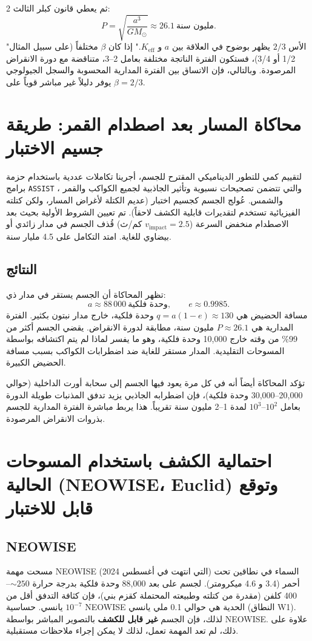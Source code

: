 \documentclass[11pt,a4paper]{article}
\begin{document}
\begin{multicols}{2}
		ثم يعطي قانون كبلر الثالث:
		\[
		P = \sqrt{\frac{a^3}{GM_{\odot}}} \approx 26.1\ \text{مليون سنة}.
		\]
		"الأس \(2/3\) يظهر بوضوح في العلاقة بين \(a\) و \(K_{\mathrm{eff}}\)." إذا كان \(\beta\) مختلفاً (على سبيل المثال 1/2 أو 3/4)، فستكون الفترة الناتجة مختلفة بعامل 2–3، متناقضة مع دورة الانقراض المرصودة. وبالتالي، فإن الاتساق بين الفترة المدارية المحسوبة والسجل الجيولوجي يوفر دليلاً غير مباشر قوياً على \(\beta = 2/3\).
		
		\section{محاكاة المسار بعد اصطدام القمر: طريقة جسيم الاختبار}
		لتقييم كمي للتطور الديناميكي المقترح للجسم، أجرينا تكاملات عددية باستخدام حزمة برامج \texttt{ASSIST} \cite{Tamayo2020}، والتي تتضمن تصحيحات نسبوية وتأثير الجاذبية لجميع الكواكب والقمر والشمس. عُولج الجسم كجسيم اختبار (عديم الكتلة لأغراض المسار، ولكن كتلته الفيزيائية تستخدم لتقديرات قابلية الكشف لاحقاً). تم تعيين الشروط الأولية بحيث بعد الاصطدام منخفض السرعة (\(v_{\text{impact}} = 2.5\) كم/ث) قُذف الجسم في مدار زائدي أو بيضاوي للغاية. امتد التكامل على 4.5 مليار سنة.
		
		\subsection{النتائج}
		تظهر المحاكاة أن الجسم يستقر في مدار ذي:
		\[
		a \approx 88\,000\ \text{وحدة فلكية},\qquad e \approx 0.9985.
		\]
		مسافة الحضيض هي \(q = a(1-e) \approx 130\) وحدة فلكية، خارج مدار نبتون بكثير. الفترة المدارية هي \(P \approx 26.1\) مليون سنة، مطابقة لدورة الانقراض. يقضي الجسم أكثر من 99\% من وقته خارج 10,000 وحدة فلكية، وهو ما يفسر لماذا لم يتم اكتشافه بواسطة المسوحات التقليدية. المدار مستقر للغاية ضد اضطرابات الكواكب بسبب مسافة الحضيض الكبيرة.
		
		تؤكد المحاكاة أيضاً أنه في كل مرة يعود فيها الجسم إلى سحابة أورت الداخلية (حوالي 20,000–30,000 وحدة فلكية)، فإن اضطرابه الجاذبي يزيد تدفق المذنبات طويلة الدورة بعامل \(10^2\)–\(10^3\) لمدة 1–2 مليون سنة تقريباً. هذا يربط مباشرة الفترة المدارية للجسم بذروات الانقراض المرصودة.
		
		\section{احتمالية الكشف باستخدام المسوحات الحالية (NEOWISE، Euclid) وتوقع قابل للاختبار}
		\subsection{NEOWISE}
		مسحت مهمة NEOWISE (التي انتهت في أغسطس 2024) السماء في نطاقين تحت أحمر (3.4 و 4.6 ميكرومتر). لجسم على بعد 88,000 وحدة فلكية بدرجة حرارة \(\sim 250\)–400 كلفن (مقدرة من كتلته وطبيعته المحتملة كقزم بني)، فإن كثافة التدفق أقل من \(10^{-7}\) يانسي. حساسية NEOWISE الحدية هي حوالي 0.1 ملي يانسي (النطاق W1). لذلك، فإن الجسم \textbf{غير قابل للكشف} بالتصوير المباشر بواسطة NEOWISE. علاوة على ذلك، لم تعد المهمة تعمل، لذلك لا يمكن إجراء ملاحظات مستقبلية.
		

\end{multicols}
\end{document}
